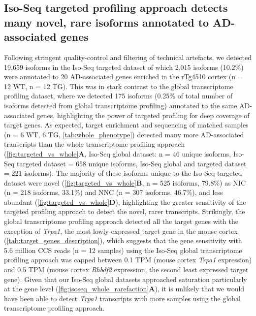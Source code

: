 \newpage
\subsection{Iso-Seq targeted profiling approach detects many novel, rare isoforms annotated to AD-associated genes}
\label{ch6: wholevstargeted}
Following stringent quality-control and filtering of technical artefacts, we detected 19,659 isoforms in the Iso-Seq targeted dataset of which 2,015 isoforms (10.2\%) were annotated to 20 AD-associated genes enriched in the rTg4510 cortex (n = 12 WT, n = 12 TG). This was in stark contrast to the global transcriptome profiling dataset, where we detected 175 isoforms (0.25\% of total number of isoforms detected from global transcriptome profiling) annotated to the same AD-associated genes, highlighting the power of targeted profiling for deep coverage of target genes. As expected, target enrichment and sequencing of matched samples (n = 6 WT, 6 TG, \cref{tab:whole_phenotype}) detected many more AD-associated transcripts than the whole transcriptome profiling approach (\cref{fig:targeted_vs_whole}\textbf{A}, Iso-Seq global dataset: n = 46 unique isoforms, Iso-Seq targeted dataset = 658 unique isoforms, Iso-Seq global and targeted dataset = 221 isoforms). The majority of these isoforms unique to the Iso-Seq targeted dataset were novel (\cref{fig:targeted_vs_whole}\textbf{B}, n = 525 isoforms, 79.8\%) as NIC (n = 218 isoforms, 33.1\%) and NNC (n = 307 isoforms, 46.7\%), and less abundant (\cref{fig:targeted_vs_whole}\textbf{D}), highlighting the greater sensitivity of the targeted profiling approach to detect the novel, rarer transcripts. Strikingly, the global transcriptome profiling approach detected all the target genes with the exception of \textit{Trpa1}, the most lowly-expressed target gene in the mouse cortex (\cref{tab:target_genes_description}), which suggests that the gene sensitivity with 5.6 million CCS reads (n = 12 samples) using the Iso-Seq global transcriptome profiling approach was capped between 0.1 TPM (mouse cortex \textit{Trpa1} expression) and 0.5 TPM (mouse cortex \textit{Rhbdf2} expression, the second least expressed target gene). Given that our Iso-Seq global datasets approached saturation particularly at the gene level (\cref{fig:isoseq_whole_rarefaction}\textbf{A}), it is unlikely that we would have been able to detect \textit{Trpa1} transcripts with more samples using the global transcriptome profiling approach.

